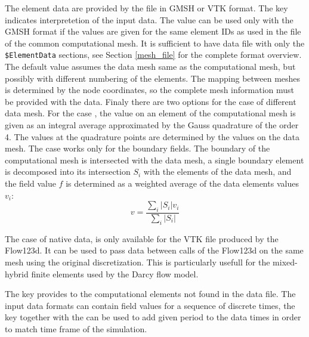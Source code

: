 \begin{description}
 The element data are provided by the file in GMSH or VTK format. The key 
 indicates interpretetion of the
 input data. The value 
 can be used only with the GMSH format if the values are given for the 
 same element IDs as used in the file of the common computational mesh. It is sufficient to have 
 data file with only the \verb|$ElementData| 
 sections, see Section \ref{mesh_file} for the complete format overview. The default value 
  assumes the data mesh same as the computational mesh, 
 but possibly with different 
 numbering of the elements. The mapping between meshes is determined by the node coordinates, so 
 the complete mesh information must be provided with the data. Finaly there are two options for the case of different data mesh. 
 For the case , the value on an element of the computational mesh is given as an integral average approximated by the Gauss quadrature of 
 the order 4. The values at the quadrature points are determined by the values on the data mesh. 
 The case  works only for the boundary fields. The boundary of the computational mesh is intersected
 with the data mesh, a single boundary element is decomposed into its intersection $S_i$ with the elements of the data mesh, and 
 the field value $f$ is determined as a weighted average of the data elements values $v_i$:
 \[
    v = \frac{\sum_i |S_i| v_i}{\sum_i |S_i|}
 \]

 The case of native data, is only available for the VTK file produced by the Flow123d. It can be used to pass data between 
calls of the Flow123d on the same mesh using the original discretization. This is particularly usefull for the mixed-hybrid 
 finite elements used by the Darcy flow model. 
 
 The key  provides to the computational elements not found in the data file.
The input data formats can contain field values for a sequence of discrete times, the key 
 together with the 
 can be used to add given period to the data times in order to match time 
frame of the simulation.  
 \end{description}

